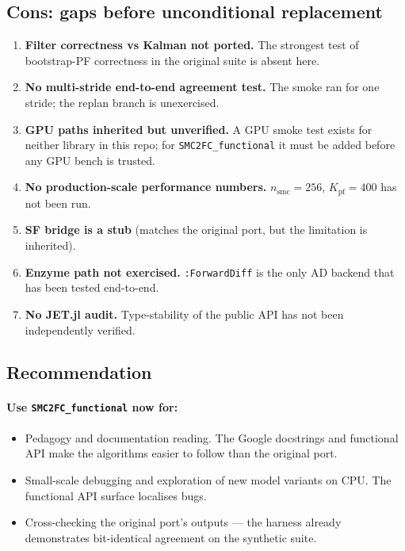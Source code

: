 \documentclass[11pt,a4paper]{article}
\begin{document}
\subsection{Cons: gaps before unconditional replacement}
\begin{enumerate}[leftmargin=*]
\item \textbf{Filter correctness vs Kalman not ported.}
The strongest test of bootstrap-PF correctness in the original suite is
absent here.
\item \textbf{No multi-stride end-to-end agreement test.} The smoke ran
for one stride; the replan branch is unexercised.
\item \textbf{GPU paths inherited but unverified.} A GPU smoke test
exists for neither library in this repo; for \texttt{SMC2FC\_functional}
it must be added before any GPU bench is trusted.
\item \textbf{No production-scale performance numbers.}
$n_{\mathrm{smc}}{=}256$, $K_{\mathrm{pf}}{=}400$ has not been run.
\item \textbf{SF bridge is a stub} (matches the original port, but the
limitation is inherited).
\item \textbf{Enzyme path not exercised.} \texttt{:ForwardDiff} is the
only AD backend that has been tested end-to-end.
\item \textbf{No JET.jl audit.} Type-stability of the public API has not
been independently verified.
\end{enumerate}

\subsection{Recommendation}

\paragraph{Use \texttt{SMC2FC\_functional} now for:}
\begin{itemize}[leftmargin=*]
\item Pedagogy and documentation reading. The Google docstrings and
functional API make the algorithms easier to follow than the original
port.
\item Small-scale debugging and exploration of new model variants on
CPU. The functional API surface localises bugs.
\item Cross-checking the original port's outputs --- the harness already
demonstrates bit-identical agreement on the synthetic suite.
\end{itemize}
\end{document}
